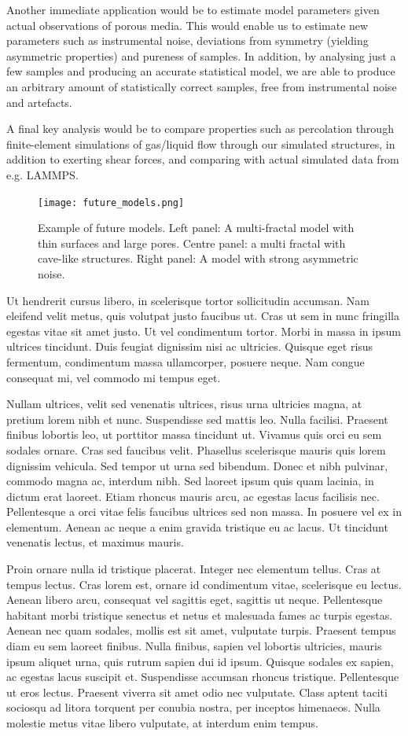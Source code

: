 \documentclass[aps,pre,twocolumn,letterpaper,floatfix,showpacs]{revtex4}
\begin{document}
Another immediate application would be to estimate model parameters given actual observations of porous media. This would enable us to estimate new parameters such as instrumental noise, deviations from symmetry (yielding asymmetric properties) and  pureness of samples. In addition, by analysing just a few samples and producing an accurate statistical model, we are able to produce an arbitrary amount of statistically correct samples, free from instrumental noise and artefacts. 

A final key analysis would be to compare properties such as percolation through finite-element simulations of gas/liquid flow through our simulated structures, in addition to exerting shear forces, and comparing with actual simulated data from e.g. LAMMPS. 

\begin{figure}
\texttt{[image: future\_models.png]}
\caption{Example of future models. Left panel: A multi-fractal model with thin surfaces and large pores. Centre panel: a multi fractal with cave-like structures. Right panel: A model with strong asymmetric noise. }
\label{fig:future_models}
\end{figure}


Ut hendrerit cursus libero, in scelerisque tortor sollicitudin accumsan. Nam eleifend velit metus, quis volutpat justo faucibus ut. Cras ut sem in nunc fringilla egestas vitae sit amet justo. Ut vel condimentum tortor. Morbi in massa in ipsum ultrices tincidunt. Duis feugiat dignissim nisi ac ultricies. Quisque eget risus fermentum, condimentum massa ullamcorper, posuere neque. Nam congue consequat mi, vel commodo mi tempus eget.

Nullam ultrices, velit sed venenatis ultrices, risus urna ultricies magna, at pretium lorem nibh et nunc. Suspendisse sed mattis leo. Nulla facilisi. Praesent finibus lobortis leo, ut porttitor massa tincidunt ut. Vivamus quis orci eu sem sodales ornare. Cras sed faucibus velit. Phasellus scelerisque mauris quis lorem dignissim vehicula. Sed tempor ut urna sed bibendum. Donec et nibh pulvinar, commodo magna ac, interdum nibh. Sed laoreet ipsum quis quam lacinia, in dictum erat laoreet. Etiam rhoncus mauris arcu, ac egestas lacus facilisis nec. Pellentesque a orci vitae felis faucibus ultrices sed non massa. In posuere vel ex in elementum. Aenean ac neque a enim gravida tristique eu ac lacus. Ut tincidunt venenatis lectus, et maximus mauris.

Proin ornare nulla id tristique placerat. Integer nec elementum tellus. Cras at tempus lectus. Cras lorem est, ornare id condimentum vitae, scelerisque eu lectus. Aenean libero arcu, consequat vel sagittis eget, sagittis ut neque. Pellentesque habitant morbi tristique senectus et netus et malesuada fames ac turpis egestas. Aenean nec quam sodales, mollis est sit amet, vulputate turpis. Praesent tempus diam eu sem laoreet finibus. Nulla finibus, sapien vel lobortis ultricies, mauris ipsum aliquet urna, quis rutrum sapien dui id ipsum. Quisque sodales ex sapien, ac egestas lacus suscipit et. Suspendisse accumsan rhoncus tristique. Pellentesque ut eros lectus. Praesent viverra sit amet odio nec vulputate. Class aptent taciti sociosqu ad litora torquent per conubia nostra, per inceptos himenaeos. Nulla molestie metus vitae libero vulputate, at interdum enim tempus.
\end{document}
